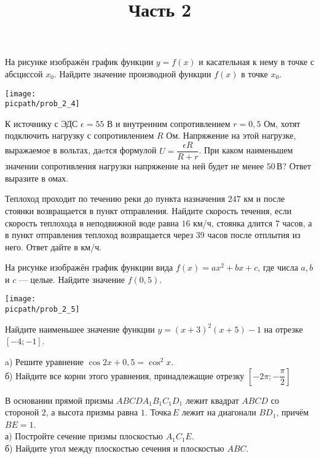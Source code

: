 \begin{training}[1]
\begin{listofex}[resume]
		\foranswer
		\item
		На рисунке изображён график функции \( y=f(x) \) и касательная к нему в точке с абсциссой \( x_0 \). Найдите значение производной функции \( f(x) \) в точке \( x_0 \).
		\begin{center}
			\texttt{[image: \\picpath/prob\_2\_4]}
		\end{center}
		\foranswer
		\item К источнику с ЭДС \( \epsilon=55 \) В и внутренним сопротивлением \( r=0,5 \) Ом, хотят подключить нагрузку с сопротивлением \( R \) Ом. Напряжение на этой нагрузке, выражаемое в вольтах, даeтся формулой \( U=\dfrac{\epsilon R}{R+r} \).  При каком наименьшем значении сопротивления нагрузки напряжение на ней будет не менее \( 50 \) В? Ответ выразите в омах.
		\foranswer
		\item Теплоход проходит по течению реки до пункта назначения \( 247 \) км и после стоянки возвращается в пункт отправления. Найдите скорость течения, если скорость теплохода в неподвижной воде равна \( 16 \) км/ч, стоянка длится \( 7 \) часов, а в пункт отправления теплоход возвращается через \( 39 \) часов после отплытия из него. Ответ дайте в км/ч.
		\foranswer
		\newpage
		\hphantom{Часть 1}
		\item 
		На рисунке изображён график функции вида \( f(x)=ax^2+bx+c \), где числа \( a \), \( b \) и \( c \) --- целые. Найдите значение \( f(0,5) \).
		\begin{center}
			\texttt{[image: \\picpath/prob\_2\_5]}
		\end{center}
		\foranswer
		\item Найдите наименьшее значение функции \( y=(x+3)^2(x+5)-1 \) на отрезке \( [-4;-1] \).
		\foranswer
		\egepreambtwo
		\title{Часть 2}
		\item a) Решите уравнение \( \cos2x+0,5=\cos^2x \). \\
		б) Найдите все корни этого уравнения, принадлежащие отрезку \( \left[ -2\pi;-\dfrac{\pi}{2} \right]  \)
		\newpage
		\hphantom{Часть 1}
		\item В основании прямой призмы \( ABCDA_1B_1C_1D_1 \) лежит квадрат \( ABCD \) со стороной \( 2 \), а высота призмы равна \( 1 \). Точка \( E \) лежит на диагонали \( BD_1 \), причём \( BE=1 \).\\
		а)  Постройте сечение призмы плоскостью \( A_1C_1E \).\\		
		б)  Найдите угол между плоскостью сечения и плоскостью \( ABC \).

\end{listofex}
\end{training}
